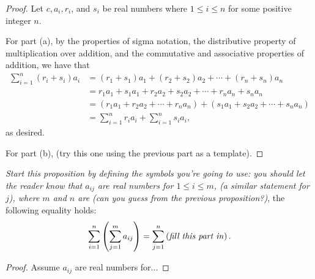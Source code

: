 \documentclass{amsart}
\begin{document}
\begin{proof} Let $c, a_i, r_i$, and $s_i$ be real numbers where $1 \leq i \leq n$ for some positive integer $n$.  

For part (a), by the properties of sigma notation, the distributive property of multiplication over addition, and the commutative and associative properties of addition, we have that
\begin{align*}
\sum_{i = 1}^n (r_i + s_i)a_i 
    &= (r_1 + s_1)a_1 + (r_2 + s_2)a_2 + \cdots + (r_n + s_n) a_n \\
    &= r_1a_1 + s_1a_1 + r_2a_2 + s_2a_2 + \cdots + r_na_n + s_na_n \\
    &= (r_1a_1 + r_2a_2 + \cdots + r_na_n) + (s_1a_1 + s_2a_2 + \cdots + s_na_n) \\
    &= \sum_{i = 1}^n r_ia_i + \sum_{i = 1}^n s_ia_i,
\end{align*}
as desired.

For part (b), (try this one using the previous part as a template).
\end{proof}

\begin{prop*}[\S1.2, \#18] \textit{Start this proposition by defining the symbols you're going to use: you should let the reader know that $a_{ij}$ are real numbers for $1 \leq i \leq m$, (a similar statement for $j$), where $m$ and $n$ are (can you guess from the previous proposition?)}, the following equality holds:
\[ \sum_{i = 1}^n \left( \sum_{j = 1}^m a_{ij} \right) 
    = \sum_{j = 1}^n \left( \text{\textit{fill this part in}} \right).\]
\end{prop*}


\begin{proof} Assume $a_{ij}$ are real numbers for...
\end{proof}
\end{document}

